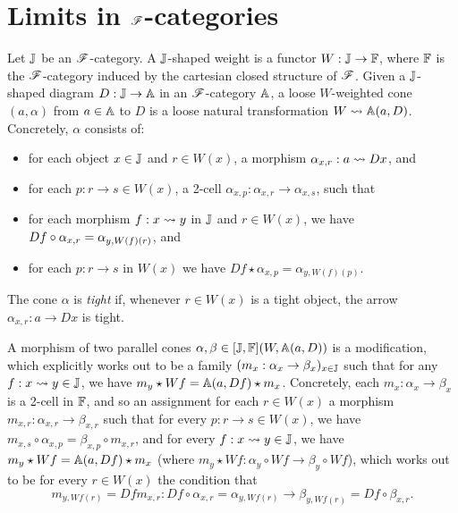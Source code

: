 \documentclass[../thesis.tex]{subfiles}
\begin{document}
  \section{Limits in \texorpdfstring{${\mathscr{F}}$}{F}-categories}

  \begin{definition}
    Let ${\mathbb{J}}$ be an ${\mathscr{F}}$-category. A ${\mathbb{J}}$-shaped weight is a functor $W : {\mathbb{J}} \to {\mathbb{F}}$, where ${\mathbb{F}}$
    is the ${\mathscr{F}}$-category induced by the cartesian closed structure of ${\mathscr{F}}$. Given a ${\mathbb{J}}$-shaped
    diagram $D : {\mathbb{J}} \to {\mathbb{A}}$ in an ${\mathscr{F}}$-category ${\mathbb{A}}$, a loose $W$-weighted cone $(a,\alpha)$
    from $a \in {\mathbb{A}}$ to $D$ is a loose natural transformation $W \rightsquigarrow {\mathbb{A}}(a,D)$. Concretely,
    $\alpha$ consists of:
    \begin{itemize}
      \item for each object $x \in {\mathbb{J}}$ and $r \in W(x)$, a morphism $\alpha_{x,r} : a \rightsquigarrow Dx$,
        and
      \item for each $p : r \to s \in W(x)$, a 2-cell $\alpha_{x,p} : \alpha_{x,r} \to \alpha_{x,s}$,
        such that
      \item for each morphism $f : x \rightsquigarrow y$ in ${\mathbb{J}}$ and $r \in W(x)$, we have $Df \circ \alpha_%
        {x,r} = \alpha_{y,W(f)(r)}$, and
      \item for each $p : r \to s$ in $W(x)$ we have $Df \star \alpha_{x,p} = \alpha_{y,W(f)(p)}$.
    \end{itemize} 
    The cone $\alpha$ is \emph{tight} if, whenever $r \in W(x)$ is a tight object, the arrow
    $\alpha_{x,r} : a \to Dx$ is tight.

    A morphism of two parallel cones $\alpha,\beta \in [{\mathbb{J}},{\mathbb{F}}](W,{\mathbb{A}}(a,D))$ is a modification,
    which explicitly works out to be a family $(m_x : \alpha_x \to \beta_x)_{x \in {\mathbb{J}}}$ such
    that for any $f : x \rightsquigarrow y \in {\mathbb{J}}$, we have $m_y \star Wf = {\mathbb{A}}(a,Df) \star m_x$. Concretely,
    each $m_x : \alpha_x \to \beta_x$ is a 2-cell in ${\mathbb{F}}$, and so an assignment for each
    $r \in W(x)$ a morphism $m_{x,r} : \alpha_{x,r} \to \beta_{x,r}$ such that for every $p :
    r \to s \in W(x)$, we have $m_{x,s} \circ \alpha_{x,p} = \beta_{x,p} \circ m_{x,r}$,
    and for every $f : x \rightsquigarrow y \in {\mathbb{J}}$, we have $m_y \star Wf = {\mathbb{A}}(a,Df) \star m_x$
    (where $m_y \star Wf : \alpha_y \circ Wf \to \beta_y \circ Wf$), which
    works out to be for every $r \in W(x)$ the condition that
    \[m_{y,Wf(r)} = Df m_{x,r} : Df \circ \alpha_{x,r} = \alpha_{y,Wf(r)} \to \beta_{y,Wf(r)}
    = Df \circ \beta_{x,r}.\]
  \end{definition}
\end{document}
